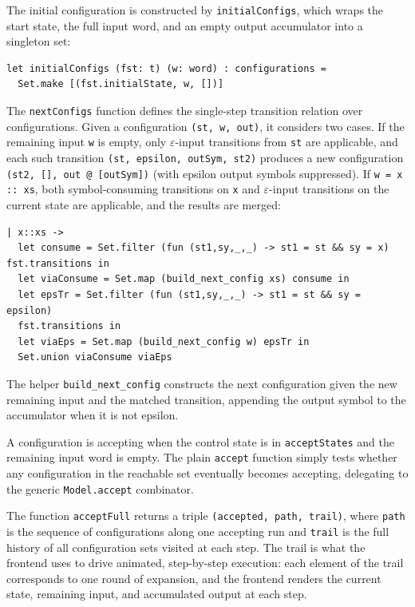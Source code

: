The initial configuration is constructed by \texttt{initialConfigs}, which wraps the start state, the full input word, 
and an empty output accumulator into a singleton set:

\begin{verbatim}
let initialConfigs (fst: t) (w: word) : configurations =
  Set.make [(fst.initialState, w, [])]
\end{verbatim}

The \texttt{nextConfigs} function defines the single-step transition relation over configurations. 
Given a configuration \texttt{(st, w, out)}, it considers two cases. If the remaining input \texttt{w} is empty, 
only $\varepsilon$-input transitions from \texttt{st} are applicable, and each such transition 
\texttt{(st, epsilon, outSym, st2)} produces a new configuration \texttt{(st2, [], out @ [outSym])} 
(with epsilon output symbols suppressed). If \texttt{w = x :: xs}, both symbol-consuming transitions on \texttt{x} 
and $\varepsilon$-input transitions on the current state are applicable, and the results are merged:

\begin{verbatim}
| x::xs ->
  let consume = Set.filter (fun (st1,sy,_,_) -> st1 = st && sy = x) fst.transitions in
  let viaConsume = Set.map (build_next_config xs) consume in
  let epsTr = Set.filter (fun (st1,sy,_,_) -> st1 = st && sy = epsilon) 
  fst.transitions in
  let viaEps = Set.map (build_next_config w) epsTr in
  Set.union viaConsume viaEps
\end{verbatim}

The helper \texttt{build\_next\_config} constructs the next configuration given the new remaining input and the matched transition, 
appending the output symbol to the accumulator when it is not epsilon.

A configuration is accepting when the control state is in \texttt{acceptStates} and the remaining input word is empty. 
The plain \texttt{accept} function simply tests whether any configuration in the reachable set eventually becomes accepting, 
delegating to the generic \texttt{Model.accept} combinator.

The function \texttt{acceptFull} returns a triple \texttt{(accepted, path, trail)}, where \texttt{path} 
is the sequence of configurations along one accepting run and \texttt{trail} is the full history of all 
configuration sets visited at each step. The trail is what the frontend uses to drive animated, step-by-step execution: 
each element of the trail corresponds to one round of expansion, and the frontend renders the current state, 
remaining input, and accumulated output at each step.

